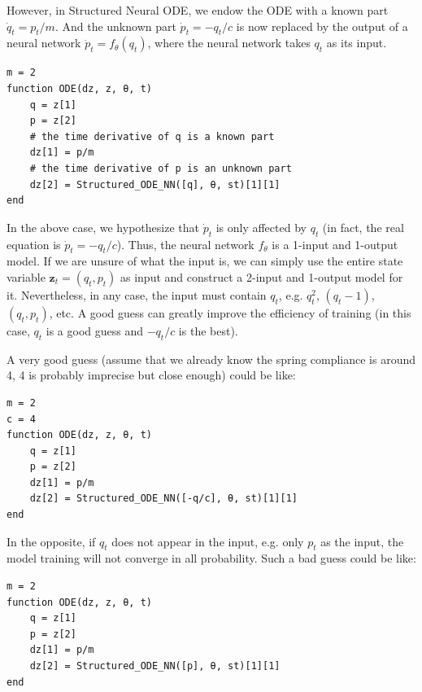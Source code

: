 \documentclass[
	parskip, 			   %
	twoside, 			   %
	DIV=14, 			   %
	BCOR=15.0mm, 		   %
	headsepline, 		   %
	open=right, 		   %
	captions=tableheading, %
	bibliography=totoc,    %
	numbers=noenddot       %
]{scrreprt}
\begin{document}
However, in Structured Neural ODE, we endow the ODE with a known part $\dot{q}_t = p_t/m$. And the unknown part $\dot{p}_t = -q_t/c$ is now replaced by the output of a neural network $\dot{p}_t = f_{\theta}(q_t)$, where the neural network takes $q_t$ as its input.

\begin{verbatim}
m = 2
function ODE(dz, z, θ, t)
    q = z[1]
    p = z[2]
    # the time derivative of q is a known part
    dz[1] = p/m
    # the time derivative of p is an unknown part
    dz[2] = Structured_ODE_NN([q], θ, st)[1][1]
end
\end{verbatim}

In the above case, we hypothesize that $\Dot{p}_t$ is only affected by $q_t$ (in fact, the real equation is $\dot{p}_t = -q_t/c$). Thus, the neural network $f_{\theta}$ is a 1-input and 1-output model. If we are unsure of what the input is, we can simply use the entire state variable $\mathbf{z}_t = (q_t, p_t)$ as input and construct a 2-input and 1-output model for it. Nevertheless, in any case, the input must contain $q_t$, e.g. $q_t^2$, $(q_t-1)$, $(q_t, p_t)$, etc. A good guess can greatly improve the efficiency of training (in this case, $q_t$ is a good guess and $-q_t/c$ is the best). 

A very good guess (assume that we already know the spring compliance is around 4, 4 is probably imprecise but close enough) could be like:

\begin{verbatim}
m = 2
c = 4
function ODE(dz, z, θ, t)
    q = z[1]
    p = z[2]
    dz[1] = p/m
    dz[2] = Structured_ODE_NN([-q/c], θ, st)[1][1]
end
\end{verbatim}

In the opposite, if $q_t$ does not appear in the input, e.g. only $p_t$ as the input, the model training will not converge in all probability. Such a bad guess could be like:

\begin{verbatim}
m = 2
function ODE(dz, z, θ, t)
    q = z[1]
    p = z[2]
    dz[1] = p/m
    dz[2] = Structured_ODE_NN([p], θ, st)[1][1]
end
\end{verbatim}
\end{document}

